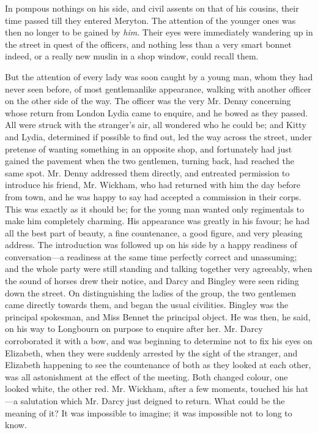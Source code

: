 In pompous nothings on his side, and civil assents on that of his cousins, their time passed till they entered Meryton. The attention of the younger ones was then no longer to be gained by {\em him}. Their eyes were immediately wandering up in the street in quest of the officers, and nothing less than a very smart bonnet indeed, or a really new muslin in a shop window, could recall them.

But the attention of every lady was soon caught by a young man, whom they had never seen before, of most gentlemanlike appearance, walking with another officer on the other side of the way. The officer was the very Mr. Denny concerning whose return from London Lydia came to enquire, and he bowed as they passed. All were struck with the stranger's air, all wondered who he could be; and Kitty and Lydia, determined if possible to find out, led the way across the street, under pretense of wanting something in an opposite shop, and fortunately had just gained the pavement when the two gentlemen, turning back, had reached the same spot. Mr. Denny addressed them directly, and entreated permission to introduce his friend, Mr. Wickham, who had returned with him the day before from town, and he was happy to say had accepted a commission in their corps. This was exactly as it should be; for the young man wanted only regimentals to make him completely charming. His appearance was greatly in his favour; he had all the best part of beauty, a fine countenance, a good figure, and very pleasing address. The introduction was followed up on his side by a happy readiness of conversation---a readiness at the same time perfectly correct and unassuming; and the whole party were still standing and talking together very agreeably, when the sound of horses drew their notice, and Darcy and Bingley were seen riding down the street. On distinguishing the ladies of the group, the two gentlemen came directly towards them, and began the usual civilities. Bingley was the principal spokesman, and Miss Bennet the principal object. He was then, he said, on his way to Longbourn on purpose to enquire after her. Mr. Darcy corroborated it with a bow, and was beginning to determine not to fix his eyes on Elizabeth, when they were suddenly arrested by the sight of the stranger, and Elizabeth happening to see the countenance of both as they looked at each other, was all astonishment at the effect of the meeting. Both changed colour, one looked white, the other red. Mr. Wickham, after a few moments, touched his hat---a salutation which Mr. Darcy just deigned to return. What could be the meaning of it? It was impossible to imagine; it was impossible not to long to know.

